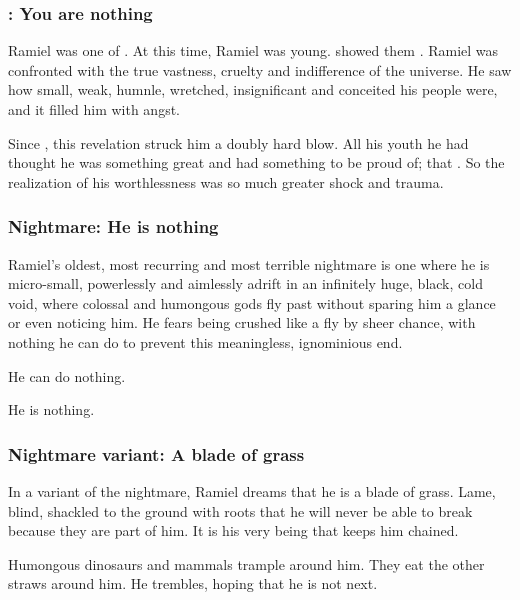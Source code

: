 \subsubsection{\Semiza{}: You are nothing}
Ramiel was one of . 
At this time, Ramiel was young. 
\Semiza{} showed them . 
Ramiel was confronted with the true vastness, cruelty and indifference of the universe. 
He saw how small, weak, humnle, wretched, insignificant and conceited his people were, and it filled him with angst. 

Since , this revelation struck him a doubly hard blow. 
All his youth he had thought he was something great and had something to be proud of; that . 
So the realization of his worthlessness was so much greater shock and trauma. 




\subsubsection{Nightmare: He is nothing}
Ramiel's oldest, most recurring and most terrible nightmare is one where he is micro-small, powerlessly and aimlessly adrift in an infinitely huge, black, cold void, where colossal and humongous gods fly past without sparing him a glance or even noticing him. 
He fears being crushed like a fly by sheer chance, with nothing he can do to prevent this meaningless, ignominious end. 

He can do nothing. 

He is nothing. 




\subsubsection{Nightmare variant: A blade of grass}
In a variant of the  nightmare, Ramiel dreams that he is a blade of grass. 
Lame, blind, shackled to the ground with roots that he will never be able to break because they are part of him. 
It is his very being that keeps him chained. 

Humongous dinosaurs and mammals trample around him. 
They eat the other straws around him. 
He trembles, hoping that he is not next. 

